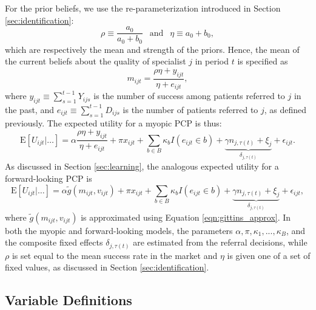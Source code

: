 \documentclass[12pt]{article}
\begin{document}
For the prior beliefs, we use the re-parameterization introduced in Section \ref{sec:identification}:
\begin{equation}
     \rho \equiv \frac{a_0}{a_0 + b_0}
     \ \ \text{ and } \ \ 
     \eta \equiv a_0 + b_0 ,
\end{equation}
which are respectively the mean and strength of the priors. Hence, the mean of the current beliefs about the quality of specialist $j$ in period $t$ is specified as
\begin{equation}
    m_{ijt} = 
    \frac{\rho \eta + y_{ijt}}{\eta + e_{ijt}} ,
\label{eqn:mean_belief}    
\end{equation}
where $y_{ijt} \equiv \sum_{s=1}^{t-1} Y_{ijs}$ is the number of success among patients referred to $j$ in the past, and $e_{ijt} \equiv \sum_{s=1}^{t-1} D_{ijs}$ is the number of patients referred to $j$, as defined previously.
The expected utility for a myopic PCP is thus:
\begin{equation}
    \text{E} \left[ U_{ijt} | \dots \right] =
    \alpha \frac{\rho \eta + y_{ijt}}{\eta + e_{ijt}}
    + \pi x_{ijt} + \sum_{b \in B}\kappa_{b} I(e_{ijt} \in {b}) + \underbrace{\gamma n_{j, \tau(t)} + \xi_{j}}_{\delta_{j, \tau(t)}} + \epsilon_{ijt} .
\label{eqn:myopic_spec}    
\end{equation}
As discussed in Section \ref{sec:learning}, the analogous expected utility for a forward-looking PCP is
\begin{equation}
    \text{E} \left[ U_{ijt} | \dots \right] =
    \alpha \tilde g(m_{ijt},v_{ijt})
    + \pi x_{ijt} + \sum_{b \in B}\kappa_{b} I(e_{ijt} \in {b}) + \underbrace{\gamma n_{j, \tau(t)} + \xi_{j}}_{\delta_{j, \tau(t)}} + \epsilon_{ijt},
\label{eqn:fwd_spec}    
\end{equation}
where $\tilde g(m_{ijt},v_{ijt})$ is approximated using Equation \eqref{eqn:gittins_approx}. In both the myopic and forward-looking models, the parameters $\alpha, \pi, \kappa_{1},...,\kappa_{B}$, and the composite fixed effects $\delta_{j, \tau(t)}$ are estimated from the referral decisions, while $\rho$ is set equal to the mean success rate in the market and $\eta$ is given one of a set of fixed values, as discussed in Section \ref{sec:identification}. 


\subsection{Variable Definitions}
\end{document}
